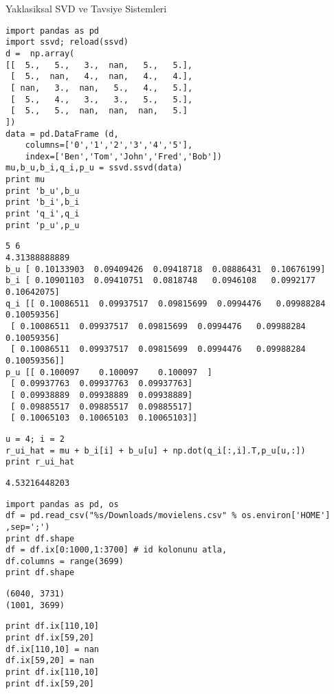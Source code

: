 \documentclass[12pt,fleqn]{article}\usepackage{../common}
\begin{document}
Yaklasiksal SVD ve Tavsiye Sistemleri

\begin{verbatim}
import pandas as pd
import ssvd; reload(ssvd)
d =  np.array(
[[  5.,   5.,   3.,  nan,   5.,   5.],
 [  5.,  nan,   4.,  nan,   4.,   4.],
 [ nan,   3.,  nan,   5.,   4.,   5.],
 [  5.,   4.,   3.,   3.,   5.,   5.],
 [  5.,   5.,  nan,  nan,  nan,   5.]
])
data = pd.DataFrame (d,
    columns=['0','1','2','3','4','5'],
    index=['Ben','Tom','John','Fred','Bob'])
mu,b_u,b_i,q_i,p_u = ssvd.ssvd(data)
print mu
print 'b_u',b_u
print 'b_i',b_i
print 'q_i',q_i
print 'p_u',p_u
\end{verbatim}

\begin{verbatim}
5 6
4.31388888889
b_u [ 0.10133903  0.09409426  0.09418718  0.08886431  0.10676199]
b_i [ 0.10901103  0.09410751  0.0818748   0.0946108   0.0992177   0.10642075]
q_i [[ 0.10086511  0.09937517  0.09815699  0.0994476   0.09988284  0.10059356]
 [ 0.10086511  0.09937517  0.09815699  0.0994476   0.09988284  0.10059356]
 [ 0.10086511  0.09937517  0.09815699  0.0994476   0.09988284  0.10059356]]
p_u [[ 0.100097    0.100097    0.100097  ]
 [ 0.09937763  0.09937763  0.09937763]
 [ 0.09938889  0.09938889  0.09938889]
 [ 0.09885517  0.09885517  0.09885517]
 [ 0.10065103  0.10065103  0.10065103]]
\end{verbatim}


\begin{verbatim}
u = 4; i = 2
r_ui_hat = mu + b_i[i] + b_u[u] + np.dot(q_i[:,i].T,p_u[u,:])
print r_ui_hat
\end{verbatim}

\begin{verbatim}
4.53216448203
\end{verbatim}






\begin{verbatim}
import pandas as pd, os
df = pd.read_csv("%s/Downloads/movielens.csv" % os.environ['HOME'] ,sep=';')
print df.shape
df = df.ix[0:1000,1:3700] # id kolonunu atla,
df.columns = range(3699)
print df.shape
\end{verbatim}

\begin{verbatim}
(6040, 3731)
(1001, 3699)
\end{verbatim}

\begin{verbatim}
print df.ix[110,10]
print df.ix[59,20]
df.ix[110,10] = nan
df.ix[59,20] = nan
print df.ix[110,10]
print df.ix[59,20]
\end{verbatim}
\end{document}
